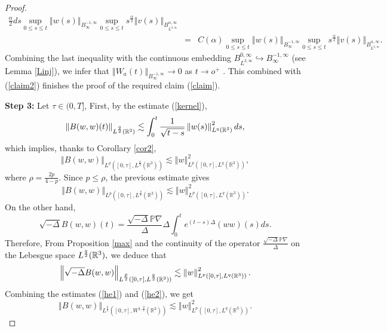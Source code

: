 \documentclass[11pt]{amsart}%
\theoremstyle{plain}
\numberwithin{equation}{section}
\begin{document}
\begin{proof}
\begin{eqnarray*}
{{\frac{\alpha }{2}}}ds\sup_{0\leq s\leq t}\left\Vert
w(s)\right\Vert _{B_{\infty }^{-1,\infty }} \sup_{0\leq s\leq t}s^{\frac{\alpha }{2}}\left\Vert v(s)\right\Vert
_{B_{L^{3,\infty }}^{\alpha ,\infty }}\\
&=&C(\alpha ) \sup_{0\leq s\leq t}\left\Vert w(s)\right\Vert
_{B_{\infty }^{-1,\infty }}\sup_{0\leq s\leq t}s^{\frac{\alpha }{2}}\left\Vert v(s)\right\Vert _{B_{L^{3,\infty
}}^{\alpha ,\infty }}.
\end{eqnarray*}%
Combining the last inequality with the continuous embedding $B_{L^{3,\infty }}^{0,\infty }\hookrightarrow
B_{\infty }^{-1,\infty }$ (see Lemma \ref{Linj}),  we infer that $\left\Vert W_a(t)\right\Vert_{B_{\infty }^{-1,\infty }}\to 0$ as $t\to o^+$ . This combined with (\ref{claim2}) finishes the proof of the required claim (\ref{claim}).
\par\noindent\textbf{Step 3:}
Let $\tau \in (0,T]$, First, by the estimate (\ref{kernel}),
\[
\left\Vert B(w,w)(t)\right\Vert_{
L^{\frac{q}{2}}(\mathbb{R}^{3})}\lesssim \int_{0}^{t}\frac{1}{%
\sqrt{t-s}}\left\Vert w(s)\right\Vert_{L^{q}(\mathbb{R}^{3})}^2ds,
\]%
which implies, thanks to Corollary \ref{cor2},
\[
\left\Vert B(w,w)\right\Vert _{L^\rho([0,\tau ],L^{\frac{q}{2}}(%
\mathbb{R}^{3}))}\lesssim \left\Vert w\right\Vert
_{L^{p}([0,\tau ],L^{q}(\mathbb{R}^{3}))}^{2},
\]%
where $\rho =\frac{2p}{4-p}.$ Since $p\leq\rho$,
the previous estimate gives
\begin{equation}\label{he1}
\left\Vert B(w,w)\right\Vert _{L^p([0,\tau ],L^{\frac{q}{2}}(%
\mathbb{R}^{3}))}\lesssim \left\Vert w\right\Vert
_{L^{p}([0,\tau ],L^{q}(\mathbb{R}^{3}))}^{2}.
\end{equation}
On the other hand,
\[
\sqrt{-\Delta } B(w,w)(t)=\frac{\sqrt{-\Delta }\mathbb{P}\nabla }{\Delta } \Delta \int_{0}^{t} e^{(t-s)\Delta }(w w)(s)ds.
\]
Therefore, From Proposition \ref{max} and the continuity of the operator $%
\frac{\sqrt{-\Delta }\mathbb{P}\nabla }{\Delta }$ on the Lebesgue space $L^{%
\frac{q}{2}}(\mathbb{R}^{3}),$ we deduce that
\begin{equation}\label{he2}
\left\Vert \sqrt{-\Delta }B(w,w)\right\Vert _{L^{\frac{p}{2}}([0,\tau ],L^{%
\frac{q}{2}}(\mathbb{R}^{3}))}\lesssim \left\Vert w\right\Vert
_{L^{p}([0,\tau ],L^{q}(\mathbb{R}^{3}))}^{2}.
\end{equation}
Combining the estimates (\ref{he1}) and (\ref{he2}), we get
\[
\left\Vert B(w,w)\right\Vert _{L^{\frac{p}{2}}([0,\tau ],W^{1,\frac{q}{2}}(%
\mathbb{R}^{3}))}\lesssim \left\Vert w\right\Vert _{L^{p}([0,\tau ],L^{q}(%
\mathbb{R}^{3}))}^{2}.
\]
\end{proof}
\end{document}
